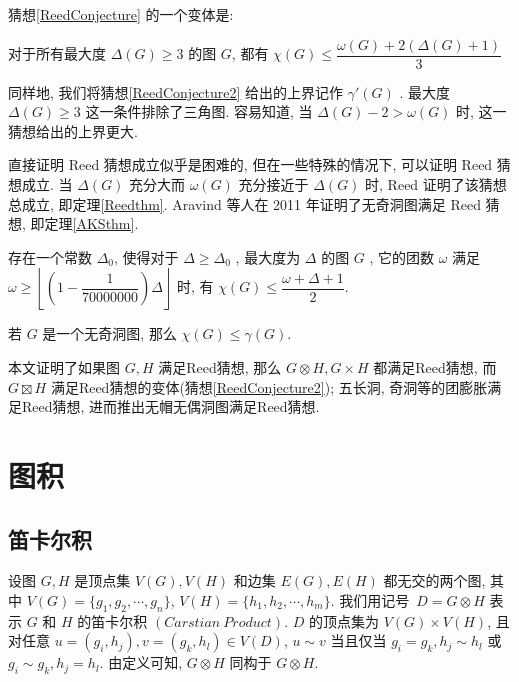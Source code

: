 \documentclass[12pt,a4paper]{article}%
\begin{document}
猜想\ref{ReedConjecture} 的一个变体是:

\begin{Conjecture}\label{ReedConjecture2}
    对于所有最大度 $\Delta(G) \geq 3$ 的图 $G$, 都有 $\chi (G) \leq \dfrac{\omega (G) + 2(\Delta (G) + 1)}{3}$
\end{Conjecture}

同样地, 我们将猜想\ref{ReedConjecture2} 给出的上界记作 $\gamma'(G)$ . 最大度 $\Delta(G) \geq 3$ 这一条件排除了三角图. 容易知道, 当 $\Delta(G) - 2 > \omega(G)$ 时, 这一猜想给出的上界更大.

直接证明 Reed 猜想成立似乎是困难的, 但在一些特殊的情况下, 可以证明 Reed 猜想成立. 当 $\Delta(G)$ 充分大而 $\omega(G)$ 充分接近于 $\Delta(G)$ 时, Reed\cite{Reed1998} 证明了该猜想总成立, 即定理\ref{Reedthm}. Aravind 等人\cite{AKS2011}在 2011 年证明了无奇洞图满足 Reed 猜想, 即定理\ref{AKSthm}. 

\begin{thm}\label{Reedthm}
    存在一个常数 $\Delta_0$, 使得对于 $\Delta \geq \Delta_0$ , 最大度为 $\Delta$ 的图 $G$ , 它的团数 $\omega$ 满足 $\omega \geq \left \lfloor (1-\dfrac{1}{70000000})\Delta \right \rfloor$ 时, 有 $\chi(G) \leq \dfrac{\omega + \Delta + 1}{2}$.
\end{thm}

\begin{thm}\label{AKSthm}
    若 $G$ 是一个无奇洞图, 那么 $\chi(G) \leq \gamma(G)$.
\end{thm}


本文证明了如果图 $G,H$ 满足Reed猜想, 那么 $G \otimes H, G \times H$ 都满足Reed猜想, 而$G \boxtimes H$ 满足Reed猜想的变体(猜想\ref{ReedConjecture2}); 五长洞, 奇洞等的团膨胀满足Reed猜想, 进而推出无帽无偶洞图满足Reed猜想.

\section{图积}
\subsection{笛卡尔积}\label{Carstian}
设图 $G,H$ 是顶点集 $V(G), V(H)$ 和边集 $E(G), E(H)$ 都无交的两个图, 其中 $V(G)=\{g_1, g_2,\cdots, g_n \}$, $V(H)=\{h_1, h_2,\cdots, h_m \}$. 我们用记号~$D = G \otimes H$ 表示 $G$ 和 $H$ 的笛卡尔积 $(Carstian\ Product)$. $D$ 的顶点集为 $V(G) \times V(H)$, 且对任意 $u = (g_i,h_j), v = (g_k,h_l)\in V(D)$, $u\sim v$ 当且仅当 $g_i = g_k,  h_j \sim  h_l$ 或 $g_i \sim g_k,  h_j = h_l$.
由定义可知, $G \otimes H$ 同构于 $G \otimes H$. 
\end{document}
